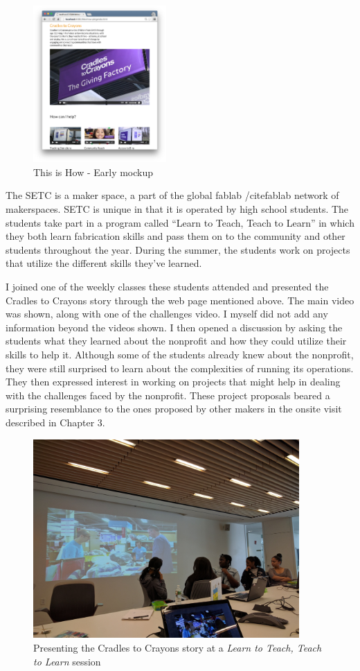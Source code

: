    \begin{figure}[thpb]
      \centering
      \includegraphics[width=2in]{figures/thisishow-mockup.png}
      \caption{This is How - Early mockup}
      \label{fig_thisishow_mockup}
   \end{figure}

The SETC is a maker space, a part of the global fablab /cite{fablab} network of maker­spaces. SETC is unique in that it is operated by high school students. The students take part in a program called ``Learn to Teach, Teach to Learn'' in which they both learn fabrication skills and pass them on to the community and other students throughout the year. During the summer, the students work on projects that utilize the different skills they've learned.

I joined one of the weekly classes these students attended and presented the Cradles to Crayons story through the web page mentioned above. The main video was shown, along with one of the challenges video. I myself did not add any information beyond the videos shown. I then opened a discussion by asking the students what they learned about the nonprofit and how they could utilize their skills to help it. Although some of the students already knew about the nonprofit, they were still surprised to learn about the complexities of running its operations. They then expressed interest in working on projects that might help in dealing with the challenges faced by the nonprofit. These project proposals beared a surprising resemblance to the ones proposed by other makers in the onsite visit described in Chapter 3.

   \begin{figure}[thpb]
      \centering
      \includegraphics[width=4in]{figures/learn2teach.jpg}
      \caption{Presenting the Cradles to Crayons story at a \textit{Learn to Teach, Teach to Learn} session}
      \label{fig_setc}
   \end{figure}

